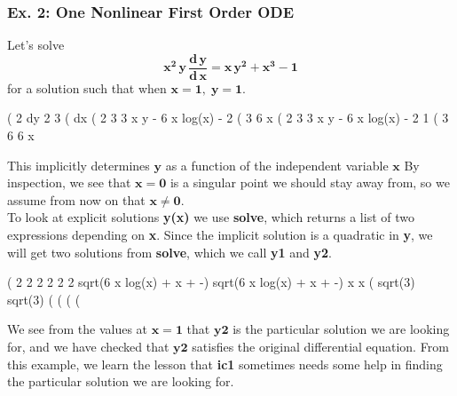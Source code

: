 \documentclass[11pt]{article}
\newcommand{\tcbr}{\textcolor{BrickRed}}
\begin{document}
\subsubsection{Ex. 2: One Nonlinear First Order ODE}
Let's solve 
\begin{equation}
\mathbf{x^{2}\,y\,\frac{d\,y}{d\,x}  = x\,y^{2} + x^{3} - 1 }
\end{equation}
for a solution such that when $\mathbf{x = 1, \; y = 1}$.
\begin{myVerbatim}
(%
                             2   dy      2    3
(%
                                 dx
(%
                              2      3
                         3 x y  - 6 x  log(x) - 2
(%
                                      3
                                   6 x
(%
                              2      3
                         3 x y  - 6 x  log(x) - 2   1
(%
                                      3             6
                                   6 x
\end{myVerbatim}
This implicitly determines $\mathbf{y}$ as a function of the independent variable $\mathbf{x}$
By inspection, we see that $\mathbf{x = 0}$ is a singular point we should
  stay away from, so we assume from now on that $\mathbf{x \neq 0}$.  \\
  
\noindent To look at \tcbr{explicit} solutions \textbf{y(x)} we use \textbf{solve},
  which returns a list of two expressions depending on \textbf{x}.  
Since the \tcbr{implicit} solution is a quadratic in \textbf{y}, we will
  get two solutions from \textbf{solve}, which we call \textbf{y1} and \textbf{y2}.
\begin{myVerbatim}
(%
                     2           2   2           2           2   2
             sqrt(6 x  log(x) + x  + -)  sqrt(6 x  log(x) + x  + -)
                                     x                           x
(%
                      sqrt(3)                     sqrt(3)
(%
(%
(%
(%
\end{myVerbatim}
We see from the values at $\mathbf{x=1}$ that $\mathbf{y2}$ is the particular solution
  we are looking for, and we have checked that $\mathbf{y2}$ satisfies the original
  differential equation.
From this example, we learn the lesson that \textbf{ic1} sometimes needs 
  some help in finding the particular solution we are looking for.\\ 
\end{document}
